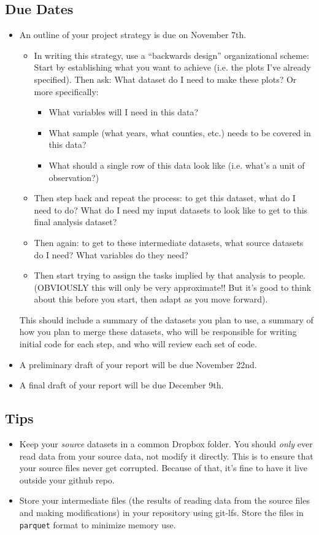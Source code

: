 \documentclass[12pt]{article}
\begin{document}
\subsection*{Due Dates}
\begin{itemize}
  \item An outline of your project strategy is due on November 7th.
  \begin{itemize}
    \item In writing this strategy, use a ``backwards design'' organizational scheme: Start by establishing what you want to achieve (i.e. the plots I've already specified). Then ask: What dataset do I need to make these plots? Or more specifically:
    \begin{itemize}
      \item What variables will I need in this data?
      \item What sample (what years, what counties, etc.) needs to be covered in this data?
      \item What should a single row of this data look like (i.e. what's a unit of observation?)
    \end{itemize}
    \item Then step back and repeat the process: to get this dataset, what do I need to do? What do I need my input datasets to look like to get to this final analysis dataset?
    \item Then again: to get to these intermediate datasets, what source datasets do I need? What variables do they need?
    \item Then start trying to assign the tasks implied by that analysis to people. (OBVIOUSLY this will only be very approximate!! But it's good to think about this before you start, then adapt as you move forward).
  \end{itemize}
  This should include a summary of the datasets you plan to use, a summary of how you plan to merge these datasets, who will be responsible for writing initial code for each step, and who will review each set of code.
  \item A preliminary draft of your report will be due November 22nd.
  \item A final draft of your report will be due December 9th.
\end{itemize}

\subsection*{Tips}
\begin{itemize}
  \item Keep your \emph{source} datasets in a common Dropbox folder. You should \emph{only} ever read data from your source data, not modify it directly. This is to ensure that your source files never get corrupted. Because of that, it's fine to have it live outside your github repo.
  \item Store your intermediate files (the results of reading data from the source files and making modifications) in your repository using git-lfs. Store the files in \texttt{parquet} format to minimize memory use.
\end{itemize}
\end{document}
